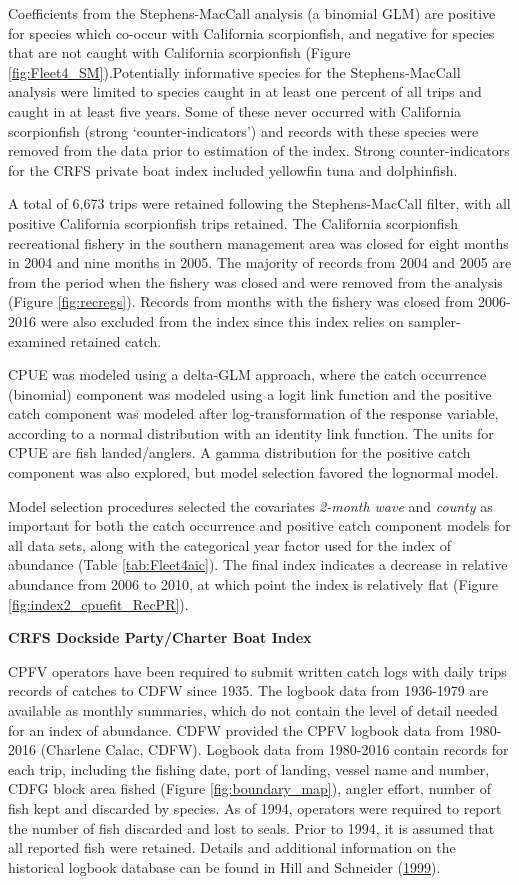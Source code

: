 \documentclass[12pt,]{article}
\begin{document}
Coefficients from the Stephens-MacCall analysis (a binomial GLM) are
positive for species which co-occur with California scorpionfish, and
negative for species that are not caught with California scorpionfish
(Figure \ref{fig:Fleet4_SM}).Potentially informative species for the
Stephens-MacCall analysis were limited to species caught in at least one
percent of all trips and caught in at least five years. Some of these
never occurred with California scorpionfish (strong
`counter-indicators') and records with these species were removed from
the data prior to estimation of the index. Strong counter-indicators for
the CRFS private boat index included yellowfin tuna and dolphinfish.

A total of 6,673 trips were retained following the Stephens-MacCall
filter, with all positive California scorpionfish trips retained. The
California scorpionfish recreational fishery in the southern management
area was closed for eight months in 2004 and nine months in 2005. The
majority of records from 2004 and 2005 are from the period when the
fishery was closed and were removed from the analysis (Figure
\ref{fig:recregs}). Records from months with the fishery was closed from
2006-2016 were also excluded from the index since this index relies on
sampler-examined retained catch.

CPUE was modeled using a delta-GLM approach, where the catch occurrence
(binomial) component was modeled using a logit link function and the
positive catch component was modeled after log-transformation of the
response variable, according to a normal distribution with an identity
link function. The units for CPUE are fish landed/anglers. A gamma
distribution for the positive catch component was also explored, but
model selection favored the lognormal model.

Model selection procedures selected the covariates \emph{2-month wave}
and \emph{county} as important for both the catch occurrence and
positive catch component models for all data sets, along with the
categorical year factor used for the index of abundance (Table
\ref{tab:Fleet4aic}). The final index indicates a decrease in relative
abundance from 2006 to 2010, at which point the index is relatively flat
(Figure \ref{fig:index2_cpuefit_RecPR}).

\textbf{CRFS Dockside Party/Charter Boat Index}

CPFV operators have been required to submit written catch logs with
daily trips records of catches to CDFW since 1935. The logbook data from
1936-1979 are available as monthly summaries, which do not contain the
level of detail needed for an index of abundance. CDFW provided the CPFV
logbook data from 1980-2016 (Charlene Calac, CDFW). Logbook data from
1980-2016 contain records for each trip, including the fishing date,
port of landing, vessel name and number, CDFG block area fished (Figure
\ref{fig:boundary_map}), angler effort, number of fish kept and
discarded by species. As of 1994, operators were required to report the
number of fish discarded and lost to seals. Prior to 1994, it is assumed
that all reported fish were retained. Details and additional information
on the historical logbook database can be found in Hill and Schneider
(\protect\hyperlink{ref-Hill1999}{1999}).
\end{document}

